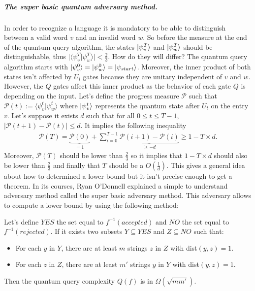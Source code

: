 \subparagraph*{\textbf{The super basic quantum adversary method.}}
In order to recognize a language it is mandatory to be able to
distinguish between a valid word $v$ and an invalid word $w$.
So before the measure at the end of the quantum query algorithm,
the states $|\psi^T_v\rangle$ and $|\psi^T_w\rangle$ should be
distinguishable, thus $\vert \langle \psi_v^T \vert \psi_w^T
    \rangle \vert < \frac{2}{3}$. How do they will differ? The
quantum query algorithm starts with $|\psi^0_v\rangle = |\psi^0_w\rangle
    = |\psi_{start}\rangle$. Moreover, the inner product
of both states isn't affected by $U_i$ gates because they are unitary
independent of $v$ and $w$. However, the $Q$ gates affect this
inner product as the behavior of each gate $Q$ is depending on the input.
Let's define the progress measure $\mathcal{P}$ such that $\mathcal{P}(t)
    := \langle \psi_v^t \vert \psi_w^t \rangle$ where $|\psi^t_v\rangle$
represents the quantum state after $U_t$ on the entry $v$. Let's suppose
it exists $d$ such that for all $0\leq t \leq T-1$,
$\vert \mathcal{P}(t+1)-\mathcal{P}(t)\vert \leq d$.
It implies the following inequality
\begin{align}
    \mathcal{P}(T) = \underbrace{\mathcal{P}(0)}_{=1} +
    \sum_{i=0}^{T-1}\underbrace{\mathcal{P}(i+1)-\mathcal{P}(i)}_{\geq -d}
    \geq 1 - T\times d.
    \label{eq:1}
\end{align}
Moreover, $\mathcal{P}(T)$ should be lower than $\frac{2}{3}$ so it
implies that $1 - T\times d$ should also be lower than $\frac{2}{3}$
and finally that $T$ should be a $O(\frac{1}{d})$. This gives a general
idea about how to determined a lower bound but it isn't precise enough
to get a theorem. In its courses, Ryan O'Donnell \cite{Odonnel_course}
explained a simple to understand adversary method called the super
basic adversary method. This adversary allows to compute a lower bound
by using the following method:

\begin{theorem}
    Let's define $YES$ the set equal to $f^{-1}(accepted)$ and $NO$ the set
    equal to \\ $f^{-1}(rejected)$. If it exists two subsets $Y\subseteq YES$ and
    $Z \subseteq NO$ such that:
    \begin{itemize}
        \item For each $y$ in $Y$, there are at least $m$ strings $z$ in $Z$ with dist$(y,z)=1$.
        \item For each $z$ in $Z$, there are at least $m'$ strings $y$ in $Y$ with dist$(y,z)=1$.
    \end{itemize}
    Then the quantum query complexity $Q(f)$ is in  $\Omega(\sqrt{m m'})$.
\end{theorem}


